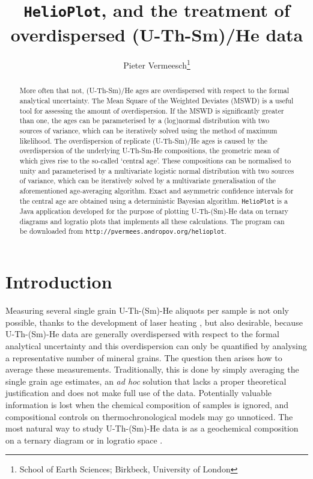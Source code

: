 \documentclass{article}
\title{{\tt HelioPlot}, and the treatment of \\overdispersed (U-Th-Sm)/He data}
\author{Pieter Vermeesch\footnote{School of Earth Sciences; 
Birkbeck, University of London}}
\date{}
\begin{document}
\linenumbers
\maketitle

\begin{abstract}
  More often that not, (U-Th-Sm)/He ages are overdispersed with
  respect to the formal analytical uncertainty.  The Mean Square of
  the Weighted Deviates (MSWD) is a useful tool for assessing the
  amount of overdispersion. If the MSWD is significantly greater than
  one, the ages can be parameterised by a (log)normal distribution
  with two sources of variance, which can be iteratively solved using
  the method of maximum likelihood.  The overdispersion of replicate
  (U-Th-Sm)/He ages is caused by the overdispersion of the underlying
  U-Th-Sm-He compositions, the geometric mean of which gives rise to
  the so-called `central age'.  These compositions can be normalised
  to unity and parameterised by a multivariate logistic normal
  distribution with two sources of variance, which can be iteratively
  solved by a multivariate generalisation of the aforementioned
  age-averaging algorithm.  Exact and asymmetric confidence intervals
  for the central age are obtained using a deterministic Bayesian
  algorithm.  {\tt HelioPlot} is a Java application developed for the
  purpose of plotting U-Th-(Sm)-He data on ternary diagrams and
  logratio plots that implements all these calculations.  The program
  can be downloaded from {\tt http://pvermees.andro\-pov.org/helio\-plot}.
\end{abstract}

\section{Introduction} \label{sec:intro}

Measuring several single grain U-Th-(Sm)-He aliquots per sample is not
only possible, thanks to the development of laser heating
\citep{house2000}, but also desirable, because U-Th-(Sm)-He data are
generally overdispersed with respect to the formal analytical
uncertainty and this overdispersion can only be quantified by
analysing a representative number of mineral grains. The question then
arises how to average these measurements.  Traditionally, this is done
by simply averaging the single grain age estimates, an {\it ad hoc}
solution that lacks a proper theoretical justification and does not
make full use of the data.  Potentially valuable information is lost
when the chemical composition of samples is ignored, and compositional
controls on thermochronological models may go unnoticed.  The most
natural way to study U-Th-(Sm)-He data is as a geochemical composition
on a ternary diagram or in logratio space \citep{vermeesch2008a}.\\
\end{document}
